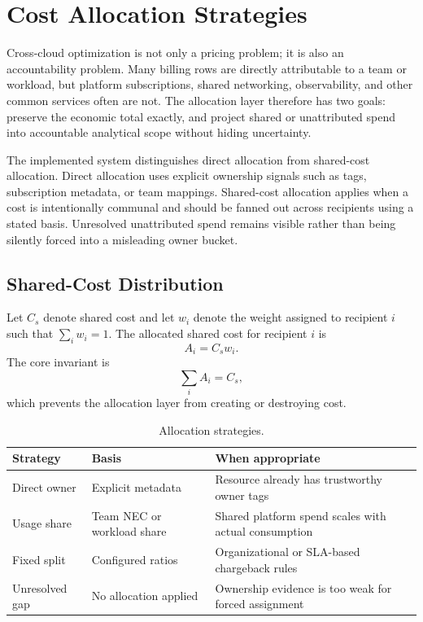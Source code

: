 \section{Cost Allocation Strategies}
\label{sec:allocation}

Cross-cloud optimization is not only a pricing problem; it is also an accountability problem. Many billing rows are directly attributable to a team or workload, but platform subscriptions, shared networking, observability, and other common services often are not. The allocation layer therefore has two goals: preserve the economic total exactly, and project shared or unattributed spend into accountable analytical scope without hiding uncertainty.

The implemented system distinguishes direct allocation from shared-cost allocation. Direct allocation uses explicit ownership signals such as tags, subscription metadata, or team mappings. Shared-cost allocation applies when a cost is intentionally communal and should be fanned out across recipients using a stated basis. Unresolved unattributed spend remains visible rather than being silently forced into a misleading owner bucket.

\subsection{Shared-Cost Distribution}
Let $C_s$ denote shared cost and let $w_i$ denote the weight assigned to recipient $i$ such that $\sum_i w_i = 1$. The allocated shared cost for recipient $i$ is
\begin{equation}
A_i = C_s w_i.
\end{equation}
The core invariant is
\begin{equation}
\sum_i A_i = C_s,
\end{equation}
which prevents the allocation layer from creating or destroying cost.

\begin{table}[t]
\caption{Allocation strategies.}
\label{tab:shared-strategies}
\centering
\footnotesize
\begin{tabularx}{\columnwidth}{p{} p{} Y}
\toprule
\textbf{Strategy} & \textbf{Basis} & \textbf{When appropriate} \\
\midrule
Direct owner & Explicit metadata & Resource already has trustworthy owner tags \\
Usage share & Team NEC or workload share & Shared platform spend scales with actual consumption \\
Fixed split & Configured ratios & Organizational or SLA-based chargeback rules \\
Unresolved gap & No allocation applied & Ownership evidence is too weak for forced assignment \\
\bottomrule
\end{tabularx}
\end{table}

